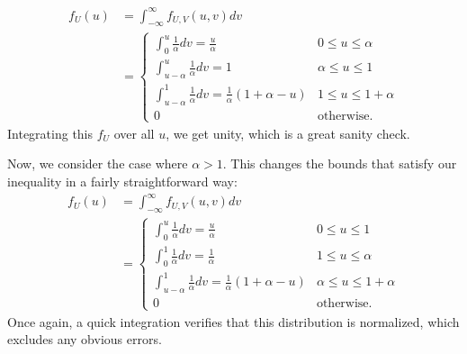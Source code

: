 \documentclass[10pt,a4paper]{article}
\theoremstyle{theorem}
\theoremstyle{definition}
\begin{document}
\begin{align*}
f_U(u) &= \int_{-\infty}^{\infty} f_{U, V}(u, v) dv\\
&= \begin{cases} 
      \int_{0}^{u} \frac{1}{\alpha} dv = \frac{u}{\alpha} & 0 \leq u \leq \alpha \\
      \int_{u - \alpha}^{u} \frac{1}{\alpha} dv = 1 & \alpha \leq u \leq 1\\
      \int_{u - \alpha}^{1} \frac{1}{\alpha} dv = \frac{1}{\alpha} (1 + \alpha - u) & 1 \leq u \leq 1 + \alpha \\
      0 & \text{otherwise.}
   \end{cases}
\end{align*}
Integrating this $f_U$ over all $u$, we get unity, which is a great sanity check.

Now, we consider the case where $\alpha > 1$. This changes the bounds that satisfy our inequality in a fairly straightforward way:
\begin{align*}
f_U(u) &= \int_{-\infty}^{\infty} f_{U, V}(u, v) dv\\
&= \begin{cases} 
      \int_{0}^{u} \frac{1}{\alpha} dv = \frac{u}{\alpha} & 0 \leq u \leq 1 \\
      \int_{0}^{1} \frac{1}{\alpha} dv = \frac{1}{\alpha} & 1 \leq u \leq \alpha\\
      \int_{u - \alpha}^{1} \frac{1}{\alpha} dv = \frac{1}{\alpha} (1 + \alpha - u) & \alpha \leq u \leq 1 + \alpha \\
      0 & \text{otherwise.}
   \end{cases}
\end{align*}
Once again, a quick integration verifies that this distribution is normalized, which excludes any obvious errors.
\end{document}
